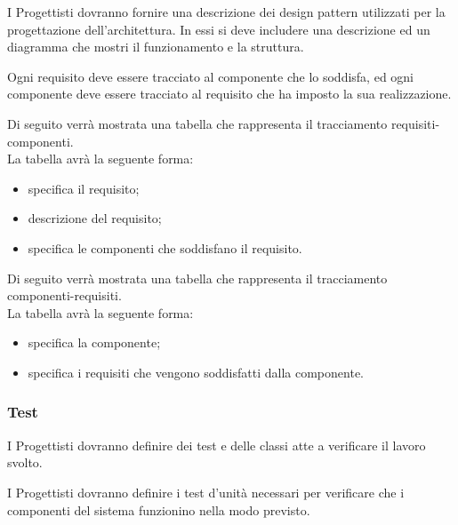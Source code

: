 \label{}
I Progettisti dovranno fornire una descrizione dei design pattern utilizzati per la progettazione dell'architettura. In essi si deve includere una descrizione ed un diagramma che mostri il funzionamento e la struttura.



\label{}
Ogni requisito deve essere tracciato al componente che lo soddisfa, ed ogni componente deve essere tracciato al requisito che ha imposto la sua realizzazione.

Di seguito verrà mostrata una tabella che rappresenta il tracciamento requisiti-componenti. \\
La tabella avrà la seguente forma:
\begin{itemize}
\item {}specifica il requisito;
\item {}descrizione del requisito;
\item {}specifica le componenti che soddisfano il requisito.
\end{itemize}

Di seguito verrà mostrata una tabella che rappresenta il tracciamento componenti-requisiti. \\
La tabella avrà la seguente forma:
\begin{itemize}
\item {}specifica la componente;
\item {}specifica i requisiti che vengono soddisfatti dalla componente.
\end{itemize}

\subsubsection{Test}

\label{}
I Progettisti dovranno definire dei test e delle classi atte a verificare il lavoro svolto. 

\label{}
I Progettisti dovranno definire i test d'unità necessari per verificare che i componenti del sistema funzionino nella modo previsto.

